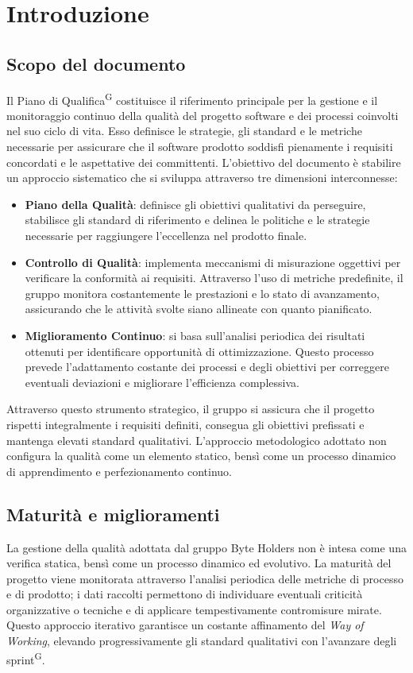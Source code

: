 \documentclass[a4paper, 11pt]{article}
\begin{document}
\section{Introduzione}

\subsection{Scopo del documento}
Il Piano di Qualifica\textsuperscript{G} costituisce il riferimento principale per la gestione e il monitoraggio continuo della qualità del progetto software e dei processi coinvolti nel suo ciclo di vita.
Esso definisce le strategie, gli standard e le metriche necessarie per assicurare che il software prodotto soddisfi pienamente i requisiti concordati e le aspettative dei committenti.
L'obiettivo del documento è stabilire un approccio sistematico che si sviluppa attraverso tre dimensioni interconnesse:

\begin{itemize}
    \item \textbf{Piano della Qualità}: definisce gli obiettivi qualitativi da perseguire, stabilisce gli standard di riferimento e delinea le politiche e le strategie necessarie per raggiungere l'eccellenza nel prodotto finale.
    \item \textbf{Controllo di Qualità}: implementa meccanismi di misurazione oggettivi per verificare la conformità ai requisiti. Attraverso l'uso di metriche predefinite, il gruppo monitora costantemente le prestazioni e lo stato di avanzamento, assicurando che le attività svolte siano allineate con quanto pianificato.
    \item \textbf{Miglioramento Continuo}: si basa sull'analisi periodica dei risultati ottenuti per identificare opportunità di ottimizzazione. Questo processo prevede l'adattamento costante dei processi e degli obiettivi per correggere eventuali deviazioni e migliorare l'efficienza complessiva.
\end{itemize}

Attraverso questo strumento strategico, il gruppo si assicura che il progetto rispetti integralmente i requisiti definiti, consegua gli obiettivi prefissati e mantenga elevati standard qualitativi.
L'approccio metodologico adottato non configura la qualità come un elemento statico, bensì come un processo dinamico di apprendimento e perfezionamento continuo.

\subsection{Maturità e miglioramenti}
La gestione della qualità adottata dal gruppo Byte Holders non è intesa come una verifica statica, bensì come un processo dinamico ed evolutivo.
La maturità del progetto viene monitorata attraverso l'analisi periodica delle metriche di processo e di prodotto; i dati raccolti permettono di individuare eventuali criticità organizzative o tecniche e di applicare tempestivamente contromisure mirate.
Questo approccio iterativo garantisce un costante affinamento del \textit{Way of Working}, elevando progressivamente gli standard qualitativi con l'avanzare degli sprint\textsuperscript{G}.
\end{document}
